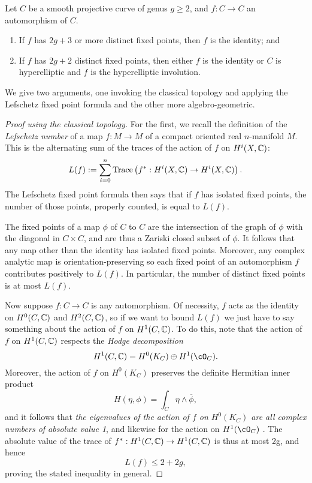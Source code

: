 \begin{lemma}
Let $C$ be a smooth projective curve of genus $g \geq 2$, and $f: C \to C$ an automorphism of $C$.
\begin{enumerate}
\item If $f$ has $2g+3$ or more distinct fixed points, then $f$ is the identity; and
\item If $f$ has $2g+2$ distinct fixed points, then either $f$ is the identity or $C$ is hyperelliptic and $f$ is the hyperelliptic involution.
\end{enumerate}
\end{lemma}

We give two arguments, one invoking the classical topology and applying the Lefschetz fixed point formula and the other more algebro-geometric.

\begin{proof}[Proof  using the classical topology]
For the first, we recall the definition of the \emph{Lefschetz number} of a map $f : M \to M$ of a compact oriented real $n$-manifold $M$. This is the alternating sum of the traces of the action of $f$ on $H^i(X,\CC)$:
$$
L(f) := \sum_{i=0}^n {\rm Trace}\left(f^* : H^i(X,\CC) \to H^i(X,\CC)\right).
$$
The Lefschetz fixed point formula then says that if $f$ has isolated fixed points, the number of those points, properly counted, is equal to $L(f)$.

The fixed points of a map $\phi$ of $C$ to $C$ are the intersection of the graph of $\phi$ with the diagonal in $C\times C$, and are thus a Zariski closed subset of $\phi$. It follows that any map other than the identity has isolated fixed points. Moreover, any complex analytic map is orientation-preserving  so each fixed point of an automorphism $f$ contributes positively to $L(f)$. In particular,  the number of distinct fixed points is at most $L(f)$.

Now suppose $f: C \to C$ is any automorphism. Of necessity, $f$ acts as the identity on $H^0(C, \CC)$ and $H^2(C, \CC)$, so if we want to bound $L(f)$ we just have to say something about the action of $f$ on $H^1(C,\CC)$. To do this, note that  the action of $f$ on $H^1(C,\CC)$ respects the \emph{Hodge decomposition}
$$
H^1(C,\CC)  = H^0(K_C) \oplus H^1(\cO_C).
$$  
Moreover, the action of $f$ on $H^0(K_C)$ preserves the definite Hermitian inner product
$$
H(\eta, \phi) = \int_C \eta \wedge \overline \phi,
$$
and it follows that \emph{the eigenvalues of the action of $f$ on $H^0(K_C)$ are all complex numbers of absolute value 1}, and likewise for the action on $H^1(\cO_C)$  . The absolute value of the trace of $f^*: H^1(C,\CC) \to H^1(C,\CC)$ is thus at most 2g, and hence
$$
L(f) \leq 2 + 2g,
$$
 proving the stated inequality in general.


\end{proof}
